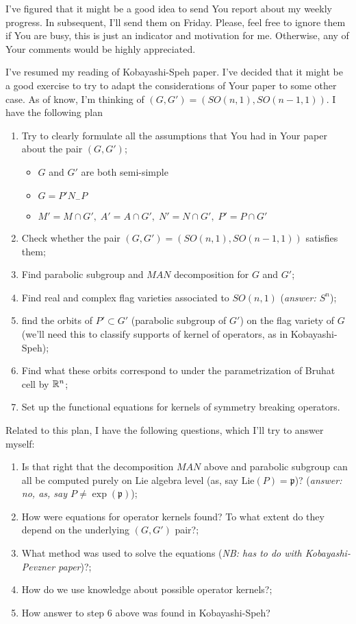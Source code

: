 \documentclass[12pt]{article} %
\begin{document}
I've figured that it might be a good idea to send You report about my weekly progress. In subsequent, I'll send them on Friday.
 Please, feel free to ignore them if You are busy, this is just an indicator and motivation for me. Otherwise, any of Your comments would be 
highly appreciated.

I've resumed my reading of Kobayashi-Speh paper. I've decided that it might be a good exercise to try to adapt the considerations of Your paper
to some other case. As of know, I'm thinking of $(G,G')=(SO(n,1),SO(n-1,1))$. I have the following plan 
\begin{enumerate}
\item Try to clearly formulate all the assumptions that You had in Your paper about the pair $(G,G')$;
\begin{itemize}
\item $G$ and $G'$ are both semi-simple
\item $G=P'N_-P$
\item $M'=M\cap G',\;A'=A\cap G',\;N'=N\cap G',\;P'=P\cap G'$ %
\end{itemize}
\item Check whether the pair $(G,G')=(SO(n,1),SO(n-1,1))$ satisfies them;
\item Find parabolic subgroup and $MAN$ decomposition for $G$ and $G'$;
\item Find real and complex flag varieties associated to $SO(n,1)$ (\textit{answer: $S^n$});
\item find the orbits of $P'\subset G'$ (parabolic subgroup of $G'$) on the flag variety of $G$ (we'll need this to classify
supports of kernel of operators, as in Kobayashi-Speh); %
\item Find what these orbits correspond to under the parametrization of Bruhat cell by $\mathbb{R}^n$;
\item Set up the functional equations for kernels of symmetry breaking operators.
\end{enumerate}
Related to this plan, I have the following questions, which I'll try to answer myself:
\begin{enumerate}
\item Is that right that the decomposition $MAN$ above and parabolic subgroup can all be computed purely on Lie algebra level (as, say
 $\mbox{Lie}(P)=\mathfrak{p}$)? (\textit{answer: no, as, say $P\neq\exp(\mathfrak{p})$});
\item How were equations for operator kernels found? To what extent do they depend on the underlying $(G,G')$ pair?;
\item What method was used to solve the equations (\textit{NB: has to do with Kobayashi-Pevzner paper})?;
\item How do we use knowledge about possible operator kernels?;
\item How answer to step 6 above was found in Kobayashi-Speh?
\end{enumerate}
\end{document}
